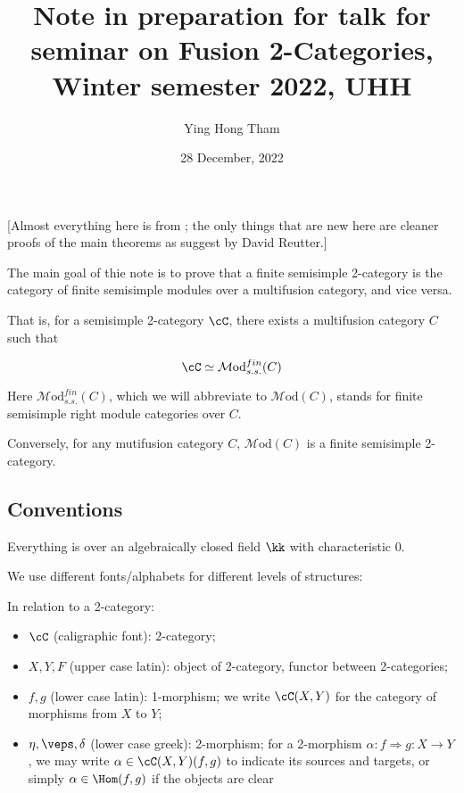 \documentclass[12pt]{article}
\newcommand{\Mod}{{\mathcal{M}\textrm{od}}}
\newcommand{\ModA}[1]{{\Mod(#1)}}
\begin{document}
\title{Note in preparation for talk for seminar on Fusion 2-Categories, Winter semester 2022, UHH}
\author{Ying Hong Tham}
\date{28 December, 2022}
\maketitle

[Almost everything here is from \cite{DRfusion};
the only things that are new here are
cleaner proofs of the main theorems
as suggest by David Reutter.]


The main goal of thie note is to prove that
a finite semisimple 2-category is the
category of finite semisimple modules
over a multifusion category, and vice versa.


That is, for a semisimple 2-category $\cC$,
there exists a multifusion category $C$
such that

\[
\cC \simeq \Mod_{s.s.}^{fin}(C)
\]

Here $\Mod_{s.s.}^{fin}(C)$,
which we will abbreviate to $\ModA{C}$,
stands for finite semisimple right module categories over $C$.

Conversely, for any mutifusion category $C$,
$\ModA{C}$ is a finite semisimple 2-category.



\subsection{Conventions}

Everything is over an algebraically closed field $\kk$
with characteristic 0.

We use different fonts/alphabets for different levels
of structures:

In relation to a 2-category:
\begin{itemize}
\item $\cC$ (caligraphic font): 2-category;

\item $X,Y,F$ (upper case latin): object of 2-category,
	functor between 2-categories;

\item $f,g$ (lower case latin): 1-morphism;
	we write $\cC(X,Y)$ for the category of morphisms
	from $X$ to $Y$;

\item $\eta,\veps,\delta$ (lower case greek): 2-morphism;
	for a 2-morphism $\alpha: f \Rightarrow g: X \to Y$,
	we may write $\alpha \in \cC(X,Y)(f,g)$
	to indicate its sources and targets,
	or simply $\alpha \in \Hom(f,g)$ if the objects are clear
\end{itemize}
\end{document}
